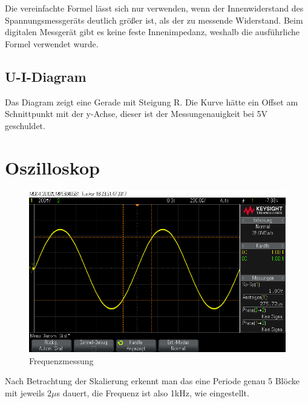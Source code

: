 \documentclass[10pt]{report}
\begin{document}
        Die vereinfachte Formel lässt sich nur verwenden, wenn der Innenwiderstand
        des Spannungsmessgeräts deutlich größer ist, als der zu messende Widerstand.
        Beim digitalen Messgerät gibt es keine feste Innenimpedanz, weshalb die
        ausführliche Formel verwendet wurde.

        \subsection{U-I-Diagram}
        \begin{center}
        \end{center}

        \noindent Das Diagram zeigt eine Gerade mit Steigung R. Die Kurve hätte ein Offset am
        Schnittpunkt mit der y-Achse, dieser ist der Messungenauigkeit bei 5V
        geschuldet.

        \section{Oszilloskop}
        \begin{figure}[H]
         \includegraphics[width=\textwidth]{scope_13.png}
         \caption{Frequenzmessung}
       \end{figure}
        Nach Betrachtung der Skalierung erkennt man das eine Periode genau 5 Blöcke
        mit jeweils $2 \mu$s dauert, die Frequenz ist also 1kHz, wie eingestellt.
\end{document}
